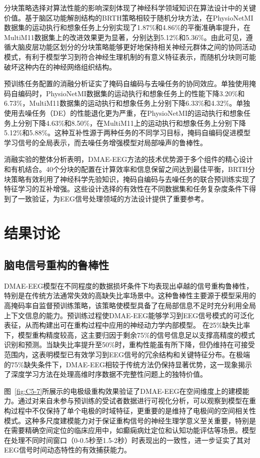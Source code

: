 分块策略选择对算法性能的影响深刻体现了神经科学领域知识在算法设计中的关键价值。基于脑区功能解剖结构的BRTH策略相较于随机分块方法，在PhysioNetMI数据集的运动执行和想象任务上分别实现了1.87\%和4.86\%的平衡准确率提升，在MultiM11数据集上的改进效果更为显著，分别达到5.12\%和5.36\%。由此可见，遵循大脑皮层功能区划分的分块策略能够更好地保持相关神经元群体之间的协同活动模式，有利于模型学习到符合神经生理机制的有意义特征表示，而随机分块则可能破坏这种内在的神经网络组织结构。

预训练任务配置的消融分析证实了掩码自编码与去噪任务的协同效应。单独使用掩码自编码时，PhysioNetMI数据集的运动执行和想象任务上的性能下降3.20\%和6.73\%，MultiM11数据集的运动执行和想象任务上分别下降6.33\%和4.32\%。单独使用去噪任务（DE）的性能退化更为严重，在PhysioNetMI的运动执行和想象任务上分别下降4.63\%和8.50\%，在MultiM11上的运动执行和想象任务上分别下降5.12\%和5.88\%。这种互补性源于两种任务的不同学习目标，掩码自编码促进模型学习信号的全局表示，而去噪任务增强模型对局部噪声的鲁棒性。

消融实验的整体分析表明，DMAE-EEG方法的技术优势源于多个组件的精心设计和有机结合。40个分块的配置在计算效率和信息保留之间达到最佳平衡，BRTH分块策略有效利用了神经科学先验知识，掩码自编码与去噪任务的联合预训练实现了特征学习的互补增强。这些设计选择的有效性在不同数据集和任务复杂度条件下得到了一致验证，为EEG信号处理领域的方法设计提供了重要参考。

\section{结果讨论}

\subsection{脑电信号重构的鲁棒性}
DMAE-EEG模型在不同程度的数据损坏条件下均表现出卓越的信号重构鲁棒性，特别是在传统方法通常失效的高缺失比率场景中。这种鲁棒性主要源于模型采用的高掩码率自监督预训练策略，该策略使模型具备了在局部信息不足时充分利用全局上下文信息的能力。预训练过程使DMAE-EEG能够学习到EEG信号模式的可泛化表征，从而构建出可在重构过程中应用的神经动力学内部模型。
在25\%缺失比率下，模型重构精度较高，这主要归因于剩余75\%的信号信息足以支撑高精度的模式识别和预测。当缺失比率提升至50\%时，重构性能虽有所下降，但仍维持在可接受范围内，这表明模型已有效学习到EEG信号的冗余结构和关键特征分布。在极端的75\%缺失条件下，DMAE-EEG相较于传统方法仍保持显著优势，这一现象揭示了深度学习方法在处理高维时序数据不完整性问题上的独特价值。

图~\ref{fig:C5-7}所展示的电极级重构效果验证了DMAE-EEG在空间维度上的建模能力。通过对来自未参与预训练的受试者数据进行可视化分析，可以观察到模型在重构过程中不仅保持了单个电极的时域特征，更重要的是维持了电极间的空间相关性模式。这种多尺度建模能力对于保证重构信号的神经生理学意义至关重要，特别是在需要精确空间定位的临床应用中，如癫痫病灶定位和认知功能评估等场景。模型在处理不同时间窗口（0-0.5秒至1.5-2秒）时表现出的一致性，进一步证实了其对EEG信号时间动态特性的有效捕获能力。


